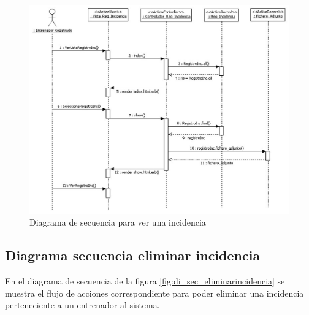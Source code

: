		  \begin{figure}[H]
			  \centering
			    \includegraphics[width=15cm]{./eps/di_diagsecuencia/RegistroInc_Ver.eps}
			  \caption{Diagrama de secuencia para ver una incidencia}
			  \label{fig:di_sec_verincidencia}
			\end{figure}
			
			\newpage
		
		\subsection{Diagrama secuencia eliminar incidencia} %
		  \label{sub:diagrama_secuencia_eliminar_incidencia}
		
		  En el diagrama de secuencia de la figura \ref{fig:di_sec_eliminarincidencia} se muestra el flujo de acciones correspondiente para poder eliminar una incidencia perteneciente a un entrenador al sistema.
		  
